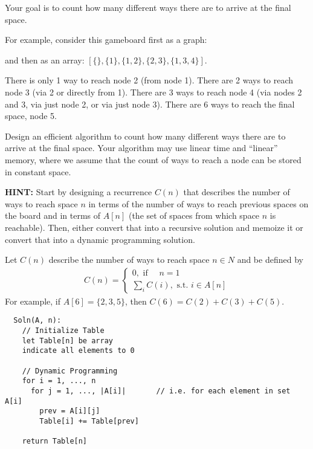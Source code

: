 \documentclass[11pt, oneside]{article}   	%
\theoremstyle{definition}
\theoremstyle{remark}
\begin{document}
Your goal is to count how many different ways there are to arrive at
the final space.

For example, consider this gameboard first as a graph:


and then as an array: $[\{\}, \{1\}, \{1,2\}, \{2,3\}, \{1,3,4\}]$.

There is only 1 way to reach node 2 (from node 1). There are 2 ways to
reach node 3 (via 2 or directly from 1). There are 3 ways to reach
node 4 (via nodes 2 and 3, via just node 2, or via just node 3). There
are 6 ways to reach the final space, node 5.

Design an efficient algorithm to count how many different ways there
are to arrive at the final space. Your algorithm may use linear time
and ``linear'' memory, where we assume that the count of ways to reach a
node can be stored in constant space.

\textbf{HINT:} Start by designing a recurrence $C(n)$ that describes the
number of ways to reach space $n$ in terms of the number of ways to
reach previous spaces on the board and in terms of $A[n]$ (the set of
spaces from which space $n$ is reachable). Then, either convert that
into a recursive solution and memoize it or convert that into a
dynamic programming solution.


Let $C(n)$ describe the number of ways to reach space $n\in {N}$ and be defined by
\begin{align*}
	C(n) = \begin{cases}
		0, \text{ if } \quad n=1\\
		\sum_i C(i), \text{ s.t. } i \in A[n]
	\end{cases}
\end{align*}
For example, if $A[6] = \{2, 3, 5\}$, then $C(6)=C(2)+C(3)+C(5)$.

\begin{verbatim}
  Soln(A, n):
    // Initialize Table
    let Table[n] be array
    indicate all elements to 0
    
    // Dynamic Programming
    for i = 1, ..., n
      for j = 1, ..., |A[i]|       // i.e. for each element in set A[i]
        prev = A[i][j]
        Table[i] += Table[prev]
    
    return Table[n]
\end{verbatim}
\end{document}
